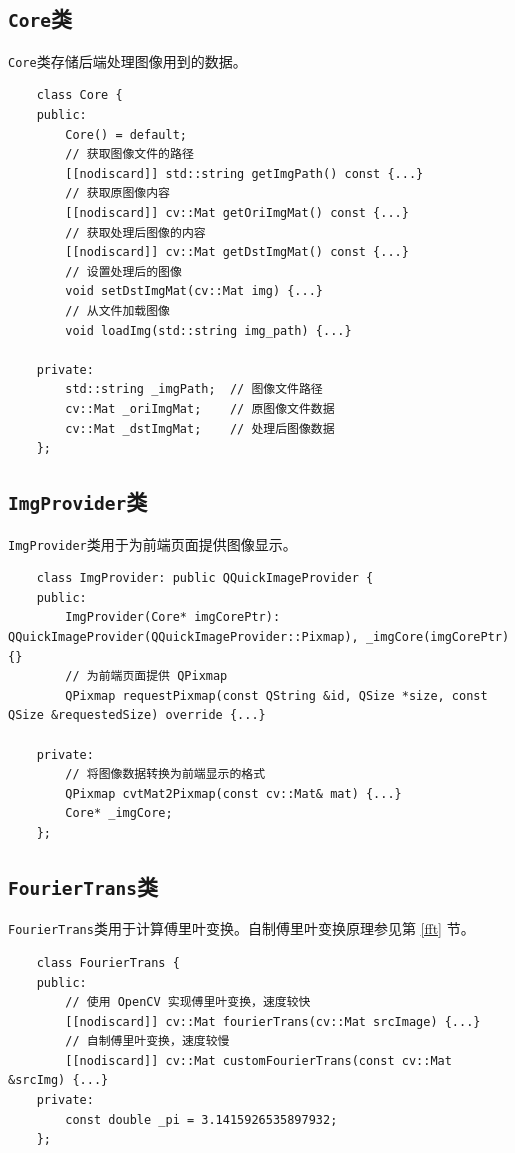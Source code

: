 \documentclass{article}
\begin{document}
\subsection{\texttt{Core}类}

\texttt{Core}类存储后端处理图像用到的数据。

\begin{lstlisting}
    class Core {
    public:
        Core() = default;
        // 获取图像文件的路径
        [[nodiscard]] std::string getImgPath() const {...}
        // 获取原图像内容
        [[nodiscard]] cv::Mat getOriImgMat() const {...}
        // 获取处理后图像的内容
        [[nodiscard]] cv::Mat getDstImgMat() const {...}
        // 设置处理后的图像
        void setDstImgMat(cv::Mat img) {...}
        // 从文件加载图像
        void loadImg(std::string img_path) {...}

    private:
        std::string _imgPath;  // 图像文件路径
        cv::Mat _oriImgMat;    // 原图像文件数据
        cv::Mat _dstImgMat;    // 处理后图像数据
    };
\end{lstlisting}

\subsection{\texttt{ImgProvider}类}

\texttt{ImgProvider}类用于为前端页面提供图像显示。

\begin{lstlisting}
    class ImgProvider: public QQuickImageProvider {
    public:
        ImgProvider(Core* imgCorePtr): QQuickImageProvider(QQuickImageProvider::Pixmap), _imgCore(imgCorePtr) {}
        // 为前端页面提供 QPixmap
        QPixmap requestPixmap(const QString &id, QSize *size, const QSize &requestedSize) override {...}

    private:
        // 将图像数据转换为前端显示的格式
        QPixmap cvtMat2Pixmap(const cv::Mat& mat) {...}
        Core* _imgCore;
    };
\end{lstlisting}

\subsection{\texttt{FourierTrans}类}

\texttt{FourierTrans}类用于计算傅里叶变换。自制傅里叶变换原理参见第 \ref{fft} 节。

\begin{lstlisting}
    class FourierTrans {
    public:
        // 使用 OpenCV 实现傅里叶变换，速度较快
        [[nodiscard]] cv::Mat fourierTrans(cv::Mat srcImage) {...}
        // 自制傅里叶变换，速度较慢
        [[nodiscard]] cv::Mat customFourierTrans(const cv::Mat &srcImg) {...}
    private:
        const double _pi = 3.1415926535897932;
    };
\end{lstlisting}
\end{document}
